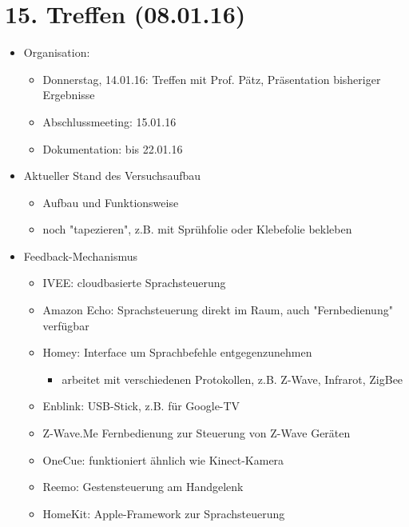 \section{15. Treffen (08.01.16)}
\begin{itemize}
	\item Organisation:
	\begin{itemize}
		\item Donnerstag, 14.01.16: Treffen mit Prof. Pätz, Präsentation bisheriger Ergebnisse
		\item Abschlussmeeting: 15.01.16
		\item Dokumentation: bis 22.01.16
	\end{itemize}

	\item Aktueller Stand des Versuchsaufbau
	\begin{itemize}
		\item Aufbau und Funktionsweise
		\item noch "tapezieren", z.B. mit Sprühfolie oder Klebefolie bekleben
	\end{itemize}

	\item Feedback-Mechanismus
	\begin{itemize}
		\item IVEE: cloudbasierte Sprachsteuerung
		\item Amazon Echo: Sprachsteuerung direkt im Raum, auch "Fernbedienung" verfügbar
		\item Homey: Interface um Sprachbefehle entgegenzunehmen
		\begin{itemize}
			\item arbeitet mit verschiedenen Protokollen, z.B. Z-Wave, Infrarot, ZigBee
		\end{itemize}
		\item Enblink: USB-Stick, z.B. für Google-TV
		\item Z-Wave.Me Fernbedienung zur Steuerung von Z-Wave Geräten
		\item OneCue: funktioniert ähnlich wie Kinect-Kamera
		\item Reemo: Gestensteuerung am Handgelenk
		\item HomeKit: Apple-Framework zur Sprachsteuerung
	\end{itemize}


\end{itemize}
